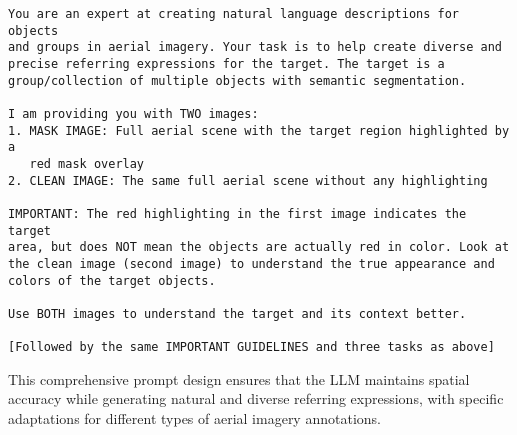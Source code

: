 \begin{small}
\begin{verbatim}
You are an expert at creating natural language descriptions for objects 
and groups in aerial imagery. Your task is to help create diverse and 
precise referring expressions for the target. The target is a 
group/collection of multiple objects with semantic segmentation.

I am providing you with TWO images:
1. MASK IMAGE: Full aerial scene with the target region highlighted by a 
   red mask overlay
2. CLEAN IMAGE: The same full aerial scene without any highlighting

IMPORTANT: The red highlighting in the first image indicates the target 
area, but does NOT mean the objects are actually red in color. Look at 
the clean image (second image) to understand the true appearance and 
colors of the target objects.

Use BOTH images to understand the target and its context better.

[Followed by the same IMPORTANT GUIDELINES and three tasks as above]
\end{verbatim}
\end{small}

This comprehensive prompt design ensures that the LLM maintains spatial accuracy while generating natural and diverse referring expressions, with specific adaptations for different types of aerial imagery annotations.